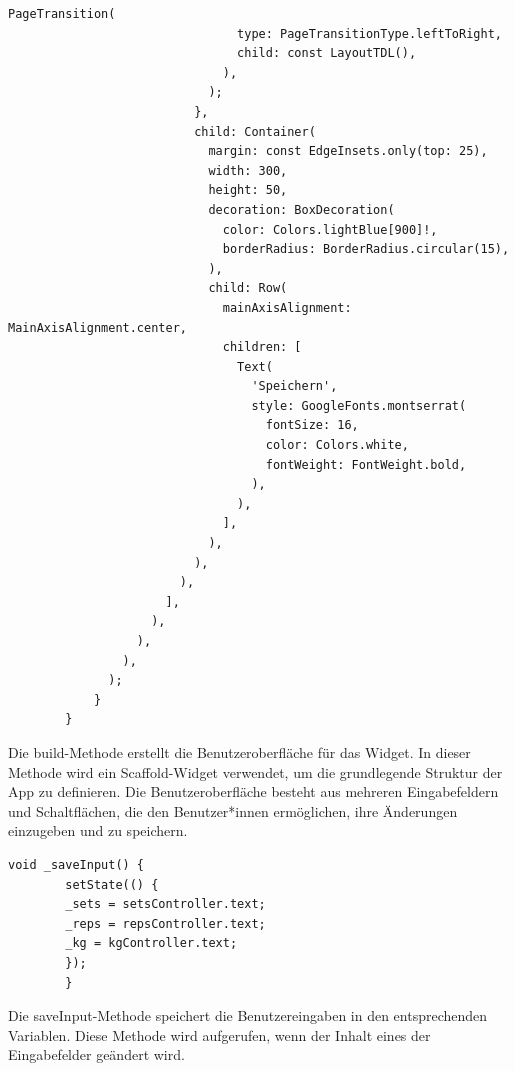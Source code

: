 \begin{lstlisting}[caption=Bearbeiten Build,label=lst:impl:frontend:qrcode]
                              PageTransition(
                                type: PageTransitionType.leftToRight,
                                child: const LayoutTDL(),
                              ),
                            );
                          },
                          child: Container(
                            margin: const EdgeInsets.only(top: 25),
                            width: 300,
                            height: 50,
                            decoration: BoxDecoration(
                              color: Colors.lightBlue[900]!,
                              borderRadius: BorderRadius.circular(15),
                            ),
                            child: Row(
                              mainAxisAlignment: MainAxisAlignment.center,
                              children: [
                                Text(
                                  'Speichern',
                                  style: GoogleFonts.montserrat(
                                    fontSize: 16,
                                    color: Colors.white,
                                    fontWeight: FontWeight.bold,
                                  ),
                                ),
                              ],
                            ),
                          ),
                        ),
                      ],
                    ),
                  ),
                ),
              );
            }
        }
        \end{lstlisting}
        
        Die build-Methode erstellt die Benutzeroberfläche für das Widget. In dieser Methode wird ein Scaffold-Widget verwendet, um die grundlegende Struktur der App zu definieren. Die Benutzeroberfläche besteht aus mehreren Eingabefeldern und Schaltflächen, die den Benutzer*innen ermöglichen, ihre Änderungen einzugeben und zu speichern.
        \\
        

        \begin{lstlisting}[caption=Bearbeiten saveInput,label=lst:impl:frontend:qrcode]
        void _saveInput() {
        setState(() {
        _sets = setsController.text;
        _reps = repsController.text;
        _kg = kgController.text;
        });
        }
        \end{lstlisting}
        
        Die saveInput-Methode speichert die Benutzereingaben in den entsprechenden Variablen. Diese Methode wird aufgerufen, wenn der Inhalt eines der Eingabefelder geändert wird.
        \\
        

